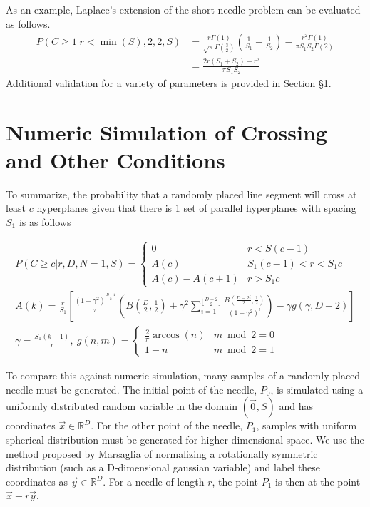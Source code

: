\documentclass{article}
\begin{document}
As an example, Laplace's extension of the short needle problem can be evaluated as follows.
\begin{align}
	P(C \ge 1|r<\min(S), 2, 2, S) &= \frac{r\Gamma(1)}{\sqrt{\pi}\Gamma(\frac{3}{2})}\left( \frac{1}{S_1}+\frac{1}{S_2}\right) - \frac{r^2\Gamma(1)}{\pi S_1S_2 \Gamma(2)} \\
	&= \frac{2r(S_1+S_2)-r^2}{\pi S_1S_2}
\end{align}
Additional validation for a variety of parameters is provided in Section \S\ref{s:n=1 numeric}.

\section{Numeric Simulation of Crossing and Other Conditions} \label{s:n=1 numeric}
To summarize, the probability that a randomly placed line segment will cross at least $c$
hyperplanes given that there is 1 set of parallel hyperplanes with spacing $S_1$ is as follows

\begin{gather*}
	P(C\ge c | r, D, N=1, S) = \begin{cases}
		0 & r < S(c-1) \\ 
		A(c)  & S_1 (c-1) < r < S_1 c \\
		A(c) - A(c+1) & r > S_1c		
	\end{cases} \\
	A(k) = \frac{r}{S_1} \left[\frac{(1-\gamma^2)^{\frac{D-1}{2}}}{\pi} \left(B\left(\frac{D}{2}, \frac{1}{2} \right) + \gamma^2 \sum_{i=1}^{\lfloor \frac{D-2}{2} \rfloor}\frac{B(\frac{D-2i}{2}, \frac{1}{2})}{(1-\gamma^2)^i}\right) - \gamma g(\gamma, D-2) \right] \\
	\gamma = \frac{S_1(k-1)}{r},\ g(n, m) = \begin{cases}
		\frac{2}{\pi}\arccos(n) & m\bmod 2 = 0 \\
		1-n & m \bmod 2 = 1
	\end{cases}
\end{gather*}

To compare this against numeric simulation, many samples of a randomly placed needle must be generated.
The initial point of the needle, $P_0$, is simulated using a uniformly distributed random variable in 
the domain $(\vec 0, S)$ and has coordinates $\vec x \in \mathbb{R}^D$. For the other point of the needle, $P_1$, samples 
with uniform spherical distribution must be generated for higher dimensional space. We use the method
proposed by Marsaglia  of normalizing a rotationally symmetric distribution 
(such as a D-dimensional gaussian variable) and label these coordinates as $\vec y \in \mathbb{R}^D$. For a needle of
length $r$, the point $P_1$ is then at the point $\vec x + r \vec y$.
\end{document}
